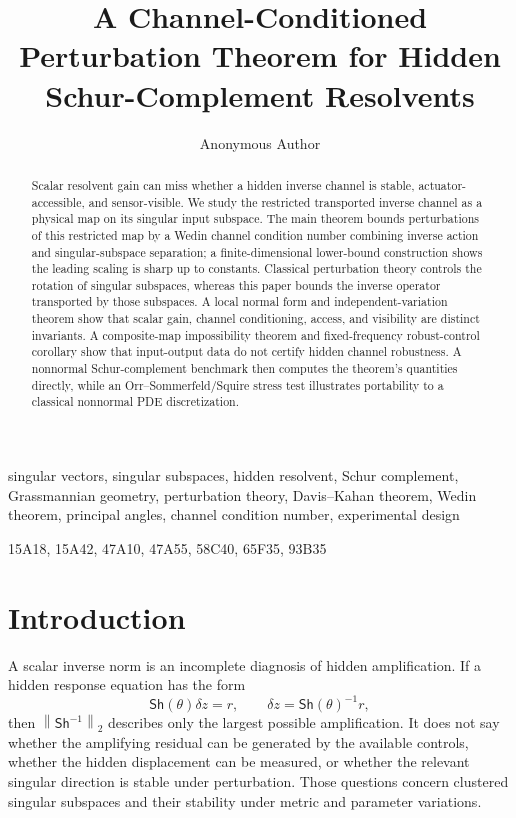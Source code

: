 \documentclass[review]{siamart220329}
\title{A Channel-Conditioned Perturbation Theorem for Hidden Schur-Complement Resolvents}
\author{Anonymous Author}
\date{}
\theoremstyle{definition}
\theoremstyle{remark}
\newcommand{\Sh}{\mathsf{Sh}}
\newcommand{\norm}[1]{\left\lVert #1\right\rVert}
\begin{document}
\maketitle

\begin{abstract}
Scalar resolvent gain can miss whether a hidden inverse channel is stable,
actuator-accessible, and sensor-visible. We study the restricted transported
inverse channel as a physical map on its singular input subspace. The main
theorem bounds perturbations of this restricted map by a Wedin channel condition
number combining inverse action and singular-subspace separation; a
finite-dimensional lower-bound construction shows the leading scaling is sharp
up to constants. Classical perturbation theory controls the rotation of singular
subspaces, whereas this paper bounds the inverse operator transported by those
subspaces. A local normal form and independent-variation theorem show that
scalar gain, channel conditioning, access, and visibility are distinct
invariants. A composite-map impossibility theorem and fixed-frequency
robust-control corollary show that input-output data do not certify hidden
channel robustness. A nonnormal Schur-complement benchmark then computes the
theorem's quantities directly, while an Orr--Sommerfeld/Squire stress test
illustrates portability to a classical nonnormal PDE discretization.
\end{abstract}

\begin{keywords}
singular vectors, singular subspaces, hidden resolvent, Schur complement, Grassmannian geometry, perturbation theory, Davis--Kahan theorem, Wedin theorem, principal angles, channel condition number, experimental design
\end{keywords}

\begin{AMS}
15A18, 15A42, 47A10, 47A55, 58C40, 65F35, 93B35
\end{AMS}

\section{Introduction}

A scalar inverse norm is an incomplete diagnosis of hidden amplification. If a hidden response equation has the form
\begin{equation}
    \Sh(\theta)\delta z=r,
    \qquad \delta z=\Sh(\theta)^{-1}r,
    \label{eq:hidden-response}
\end{equation}
then $\norm{\Sh^{-1}}_2$ describes only the largest possible amplification. It does not say whether the amplifying residual can be generated by the available controls, whether the hidden displacement can be measured, or whether the relevant singular direction is stable under perturbation. Those questions concern clustered singular subspaces and their stability under metric and parameter variations.
\end{document}
